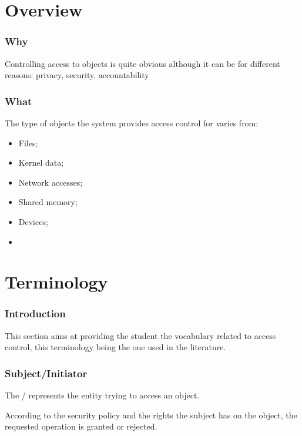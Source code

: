 %
%

\section{Overview}


\begin{frame}
  \frametitle{Why}

  Controlling access to objects is quite obvious although it can be for
  different reasons: privacy, security, accountability \etc{}
\end{frame}


\begin{frame}
  \frametitle{What}

  The type of objects the system provides access control for varies from:

  \begin{itemize}
    \item
      Files;
    \item
      Kernel data;
    \item
      Network accesses;
    \item
      Shared memory;
    \item
      Devices;
    \item
      \etc{}
  \end{itemize}
\end{frame}

%
%

\section{Terminology}


\begin{frame}
  \frametitle{Introduction}

  This section aims at providing the student the vocabulary related to
  access control, this terminology being the one used in the literature.
\end{frame}


\begin{frame}
  \frametitle{Subject/Initiator}

  The / represents the entity trying to access
  an object.

  \-

  According to the security policy and the rights the subject has on the
  object, the requested operation is granted or rejected.
\end{frame}

